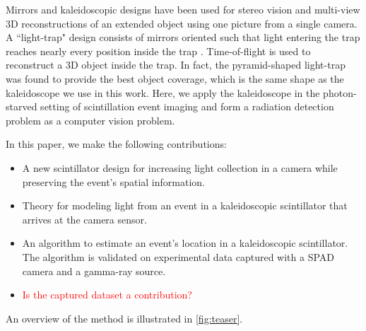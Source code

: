 

Mirrors and kaleidoscopic designs have been used for stereo vision \cite{nene1998stereo, gluckman1999planar, gluckman2002rectified} 
and multi-view 3D reconstructions \cite{reshetouski2011three, ahn2021kaleidoscopic, ahn2023neural, takahashi2021structure, bangay2004kaleidoscope, mitsumoto19923}
of an extended object using one picture from a single camera.
A ``light-trap" design consists of mirrors oriented such that light entering the 
trap reaches nearly every position inside the trap \cite{xu2018trapping}.
Time-of-flight is used to reconstruct a 3D object inside the trap.
In fact, the pyramid-shaped light-trap was found to provide the best object 
coverage, which is the same shape as the kaleidoscope we use in this work.
Here, we apply the kaleidoscope in the photon-starved setting of scintillation 
event imaging and form a radiation detection problem as a computer vision problem.


In this paper, we make the following contributions: 
\begin{itemize}
\item A new scintillator design for increasing light collection in a camera while 
preserving the event's spatial information.
\item Theory for modeling light from an event in a kaleidoscopic scintillator that 
arrives at the camera sensor.
\item An algorithm to estimate an event's location in a kaleidoscopic scintillator. 
The algorithm is validated on experimental data captured with a SPAD camera and a 
gamma-ray source.
\item \textcolor{red}{Is the captured dataset a contribution?}
\end{itemize}
An overview of the method is illustrated in \cref{fig:teaser}.



